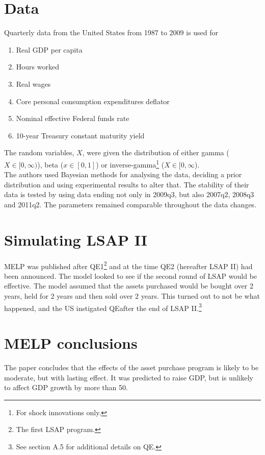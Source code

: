 \documentclass[notitlepage,12pt]{report}
\newcommand{\raiseinf}{\raisebox{0.31ex}{$\infty$}}
\begin{document}
\section{Data}

Quarterly data from the United States from 1987 to 2009 is used for
\begin{enumerate}[noitemsep]
	\item Real GDP per capita
	\item Hours worked
	\item Real wages
	\item Core personal consumption expenditures deflator
	\item Nominal effective Federal funds rate
	\item 10-year Treasury constant maturity yield
\end{enumerate}

The random variables, $X$, were given the distribution of either gamma ($X\in[0,\infty)$), beta ($x\in[0,1]$) or inverse-gamma\footnote{For shock innovations only.} ($X\in[0,\infty$).\\

The authors used Bayesian methods for analysing the data, deciding a prior distribution and using experimental results to alter that. The stability of their data is tested by using data ending not only in 2009q3, but also 2007q2, 2008q3 and 2011q2. The parameters remained comparable throughout the data changes.

\section{Simulating LSAP II}

MELP was published after QE1\footnote{The first LSAP program.} and at the time QE2 (hereafter LSAP II) had been announced. The model looked to see if the second round of LSAP would be effective. The model assumed that the assets purchased would be bought over 2 years, held for 2 years and then sold over 2 years. This turned out to not be what happened, and the US instigated QE\raiseinf after the end of LSAP II.\footnote{See section A.5 for additional details on QE\raiseinf.}

\section{MELP conclusions}

The paper concludes that the effects of the asset purchase program is likely to be moderate, but with lasting effect. It was predicted to raise GDP, but is unlikely to affect GDP growth by more than 50\textpertenthousand.
\end{document}
